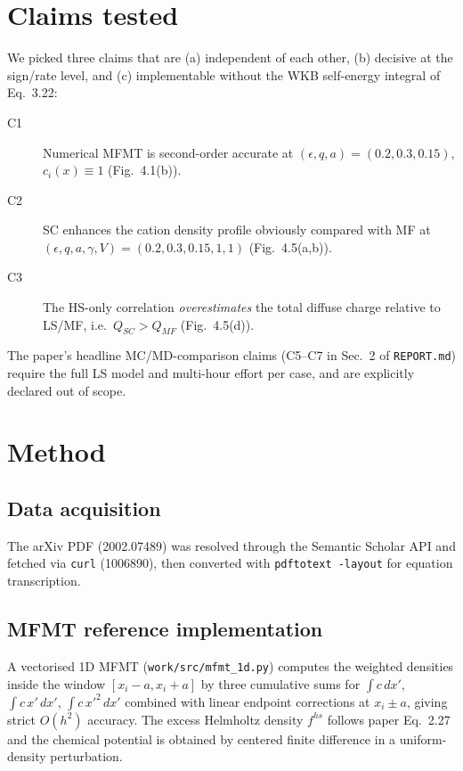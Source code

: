 \documentclass[11pt]{article}
\begin{document}
\section{Claims tested}

We picked three claims that are (a) independent of each other, (b)
decisive at the sign/rate level, and (c) implementable without the
WKB self-energy integral of Eq.~3.22:
\begin{description}
\item[C1] Numerical MFMT is second-order accurate at
  $(\epsilon,q,a)=(0.2,0.3,0.15)$, $c_i(x)\equiv 1$ (Fig.~4.1(b)).
\item[C2] SC enhances the cation density profile obviously compared
  with MF at $(\epsilon,q,a,\gamma,V)=(0.2,0.3,0.15,1,1)$
  (Fig.~4.5(a,b)).
\item[C3] The HS-only correlation \emph{overestimates} the total
  diffuse charge relative to LS/MF, i.e.\ $Q_{SC}>Q_{MF}$
  (Fig.~4.5(d)).
\end{description}
The paper's headline MC/MD-comparison claims (C5--C7 in Sec.~2 of
\texttt{REPORT.md}) require the full LS model and multi-hour effort
per case, and are explicitly declared out of scope.

\section{Method}

\subsection{Data acquisition}
The arXiv PDF (2002.07489) was resolved through the Semantic Scholar
API and fetched via \texttt{curl}
(\SI{1006890}{\byte}), then converted with \texttt{pdftotext -layout}
for equation transcription.

\subsection{MFMT reference implementation}
A vectorised 1D MFMT (\texttt{work/src/mfmt\_1d.py}) computes the
weighted densities inside the window $[x_i-a,x_i+a]$ by three
cumulative sums for $\int c\,dx'$, $\int c\,x'\,dx'$, $\int
c\,x'^2\,dx'$ combined with linear endpoint corrections at
$x_i\pm a$, giving strict $O(h^2)$ accuracy. The excess Helmholtz
density $f^{hs}$ follows paper Eq.~2.27 and the chemical potential
is obtained by centered finite difference in a uniform-density
perturbation.
\end{document}
